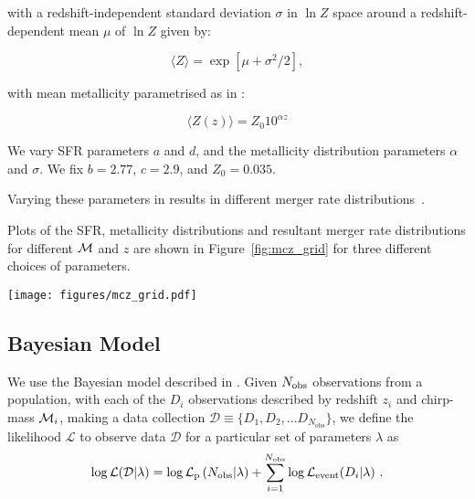 \documentclass[twocolumn]{aastex631}
\begin{document}
\bigskip\noindent
with a redshift-independent standard deviation $\sigma$ in $\ln Z$ space around a redshift-dependent mean $\mu$ of $\ln Z$ given by:

\begin{equation}
  \langle Z \rangle =
  \exp[\mu + \sigma^2/2],
\end{equation}

\bigskip\noindent
with mean metallicity parametrised as in \citet{Langer_2006}:

\begin{equation}
  \langle Z(z) \rangle =
  Z_{0}10^{\alpha{z}}
\end{equation}

\bigskip\noindent
We vary SFR parameters $a$ and $d$, and the metallicity distribution parameters $\alpha$ and $\sigma$. 
We fix $b=2.77$, $c=2.9$, and $Z_0=0.035$.  

Varying these parameters in \COMPAS results in different merger rate distributions~\citep{Riley:2023:ApJ, Neijssel_2019}. 


Plots of the SFR, metallicity distributions and resultant merger rate distributions for different $\mathcal{M}$ and $z$ are shown in Figure~\ref{fig:mcz_grid} for three different choices of parameters.

\begin{figure*}[ht!]
    \begin{centering}
        \texttt{[image: figures/mcz\_grid.pdf]}
        \caption{
            McZ grid given differnt SFR parameters. Fiducial model is in X, 
        }
        \label{fig:mcz_grid}
    \end{centering}
\end{figure*}




\subsection{Bayesian Model}




We use the Bayesian model described in \citep{Riley:2023:ApJ}.
Given $N_{\mathrm{obs}}$ observations from a population, with each of the $D_i$ observations described by redshift $z_i$ and chirp-mass $\mathcal{M}_i$, making a data collection $\mathcal{D} \equiv \{D_1, D_2, ... D_{N_{\mathrm{obs}}}\}$, we define the likelihood $\mathcal{L}$ to observe data $\mathcal{D}$ for a particular set of parameters $\lambda$ as
\begin{equation}
  \log{\Lmain} = \log{\Lp\left(N_{\mathrm{obs}}|\lambda\right)} +
  \sum_{i=1}^{N_\mathrm{obs}} \log{\Le(D_i|\lambda)}\ .
  \label{eq:methods_likelihood}
\end{equation}
\end{document}
